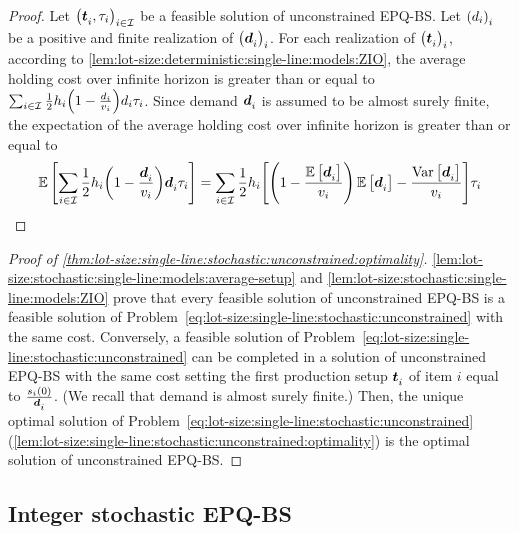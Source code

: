 \begin{proof}
Let $\bracket{\va t_i,\cover_i}_{i\in\REF}$ be a feasible solution of unconstrained EPQ-BS.
Let $\bracket{\demand_i}_i$ be a positive and finite realization of $\bracket{\va\demand_i}_i$.
For each realization of $\bracket{\va t_i}_i$, according to \cref{lem:lot-size:deterministic:single-line:models:ZIO}, the average holding cost over infinite horizon is greater than or equal to 
$\sum_{i\in\REF}\frac{1}{2}\holding_i\bracket{1-\frac{\demand_i}{\rate_i}}\demand_i\cover_i$.
Since demand $\va\demand_i$ is assumed to be almost surely finite, the expectation of the average holding cost over infinite horizon is greater than or equal to 
\begin{equation}
  \espe\sqbracket{\sum_{i\in\REF}\frac{1}{2}\holding_i\bracket{1-\frac{\va\demand_i}{\rate_i}}\va\demand_i\cover_i}
  =
  \sum_{i\in\REF}\frac{1}{2}\holding_i\sqbracket{\bracket{1-\frac{\espe\sqbracket{\va\demand_i}}{\rate_i}}\espe\sqbracket{\va\demand_i} - \frac{\vari\sqbracket{\va\demand_i}}{\rate_i}}\cover_i
\end{equation}
\end{proof}


\begin{proof}[Proof of \cref{thm:lot-size:single-line:stochastic:unconstrained:optimality}]
\cref{lem:lot-size:stochastic:single-line:models:average-setup} and \cref{lem:lot-size:stochastic:single-line:models:ZIO} prove that every feasible solution of unconstrained EPQ-BS is a feasible solution of Problem~\eqref{eq:lot-size:single-line:stochastic:unconstrained} with the same cost.
Conversely, a feasible solution of Problem~\eqref{eq:lot-size:single-line:stochastic:unconstrained} can be completed in a solution of unconstrained EPQ-BS with the same cost setting the first production setup $\va t_i$ of item $i$ equal to $\frac{\inventory_i(0)}{\va\demand_i}$.
(We recall that demand is almost surely finite.)
Then, the unique optimal solution of Problem~\eqref{eq:lot-size:single-line:stochastic:unconstrained} (\cref{lem:lot-size:single-line:stochastic:unconstrained:optimality}) is the optimal solution of unconstrained EPQ-BS.
\end{proof}


\subsection{Integer stochastic EPQ-BS}


